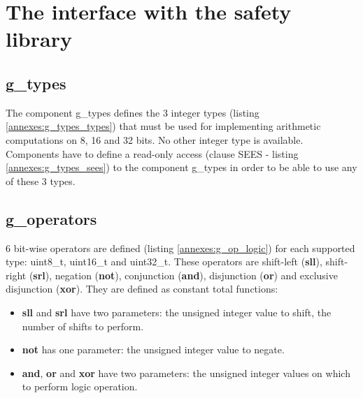 \section{The interface with the safety library}
\label{annexes:interface-with-safety-library}
\subsection{g\_types}



The component g\_types defines the 3 integer types (listing \ref{annexes:g_types_types}) that must be used for implementing arithmetic computations on 8, 16 and 32 bits. No other integer type is available.\\
Components have to define a read-only access (clause SEES - listing \ref{annexes:g_types_sees}) to the component g\_types in order to be able to use any of these 3 types.


\subsection{g\_operators}

6 bit-wise operators are defined (listing \ref{annexes:g_op_logic}) for each supported type: uint8\_t, uint16\_t and uint32\_t. These operators are shift-left (\textbf{sll}), shift-right (\textbf{srl}), negation (\textbf{not}), conjunction (\textbf{and}), disjunction (\textbf{or}) and exclusive disjunction (\textbf{xor}). They are defined as constant total functions: 
\begin{itemize}
    \item \textbf{sll} and \textbf{srl} have two parameters: the unsigned integer value to shift, the number of shifts to perform.
    \item \textbf{not} has one parameter: the unsigned integer value to negate.
    \item \textbf{and}, \textbf{or} and \textbf{xor} have two parameters: the unsigned integer values on which to perform logic operation.
\end{itemize}

